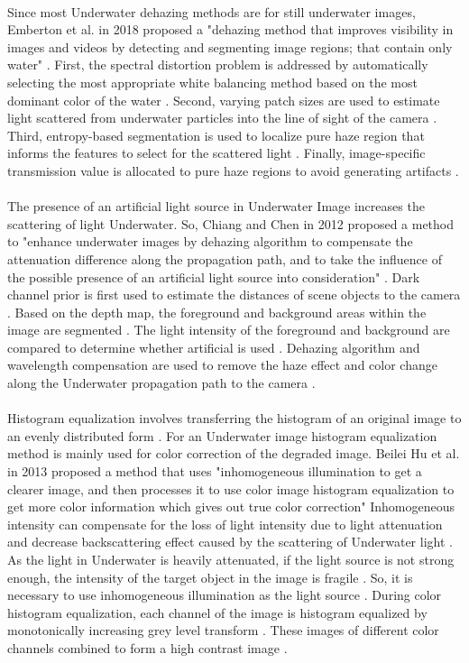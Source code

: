\documentclass[a4paper,11pt,oneside]{article}
\begin{document}
  \\
  Since most Underwater dehazing methods are for still underwater images, Emberton et al. \cite{2} in 2018 proposed a "dehazing method that improves visibility in images and videos by detecting and segmenting image regions; that contain only water" \cite{2}. First, the spectral distortion problem is addressed by automatically selecting the most appropriate white balancing method based on the most dominant color of the water \cite{2}. Second, varying patch sizes are used to estimate light scattered from underwater particles into the line of sight of the camera \cite{2}. Third, entropy-based segmentation is used to localize pure haze region that informs the features to select for the scattered light \cite{2}. Finally, image-specific transmission value is allocated to pure haze regions to avoid generating artifacts \cite{2}.\\
  \\
   The presence of an artificial light source in Underwater Image increases the scattering of light Underwater. So, Chiang and Chen in 2012 \cite{13} proposed a method to "enhance underwater images by dehazing algorithm to compensate the attenuation difference along the propagation path, and to take the influence of the possible presence of an artificial light source into consideration" \cite{13}. Dark channel prior is first used to estimate the distances of scene objects to the camera \cite{13}. Based on the depth map, the foreground and background areas within the image are segmented \cite{13}. The light intensity of the foreground and background are compared to determine whether artificial is used \cite{13}. Dehazing algorithm and wavelength compensation are used to remove the haze effect and color change along the Underwater propagation path to the camera \cite{13}.\\
  \\
  Histogram equalization involves transferring the histogram of an original image to an evenly distributed form \cite{1}. For an Underwater image histogram equalization method is mainly used for color correction of the degraded image. Beilei Hu et al. \cite{1} in 2013 proposed a method that uses "inhomogeneous illumination to get a clearer image, and then processes it to use color image histogram equalization to get more color information which gives out true color correction" \cite{1} Inhomogeneous intensity can compensate for the loss of light intensity due to light attenuation and decrease backscattering effect caused by the scattering of Underwater light \cite{1}. As the light in Underwater is heavily attenuated, if the light source is not strong enough, the intensity of the target object in the image is fragile \cite{1}. So, it is necessary to use inhomogeneous illumination as the light source \cite{1}. During color histogram equalization, each channel of the image is histogram equalized by monotonically increasing grey level transform \cite{1}. These images of different color channels combined to form a high contrast image \cite{1}.\\
\end{document}
